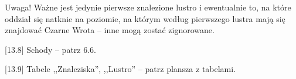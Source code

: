 Uwaga!
Ważne jest jedynie pierwsze znalezione lustro i ewentualnie to, na które oddział się natknie na poziomie, na którym według pierwszego lustra mają się znajdować Czarne Wrota – inne mogą zostać zignorowane.

[13.8] Schody – patrz 6.6.

[13.9] Tabele ,,Znaleziska'', ,,Lustro'' – patrz plansza z tabelami.